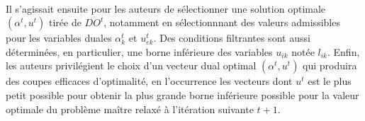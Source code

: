 \paragraph{}Il s'agissait ensuite pour les auteurs de sélectionner une solution optimale $(\alpha^t, u^t)$ tirée de $DO^t$, notamment en sélectionnnant des valeurs admissibles pour les variables duales $\alpha^t_k$ et $u^t_{ek}$. Des conditions filtrantes sont aussi déterminées, en particulier, une borne inférieure des variables $u_{ik}$ notée $l_{ik}$.
Enfin, les auteurs privilégient le choix d'un vecteur dual optimal $(\alpha^t, u^t)$ qui
produira des coupes efficaces d'optimalité, en l'occurrence les vecteurs dont $u^t$ est le plus petit possible pour obtenir la plus grande borne inférieure possible pour la valeur optimale du problème maître relaxé à l'itération suivante $t+1$.

